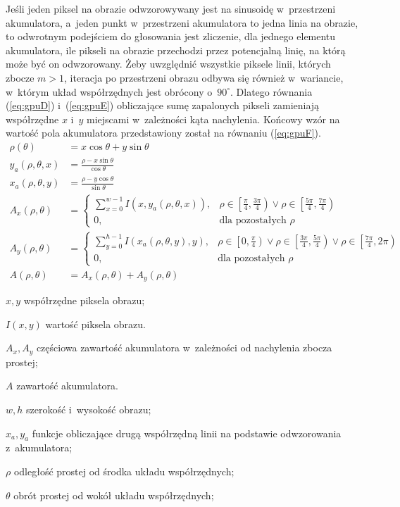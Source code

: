 Jeśli jeden piksel na obrazie odwzorowywany jest na sinusoidę w~przestrzeni akumulatora, a~jeden punkt w~przestrzeni akumulatora to jedna linia na obrazie, to odwrotnym podejściem do głosowania jest zliczenie, dla jednego elementu akumulatora, ile pikseli na obrazie przechodzi przez potencjalną linię, na którą może być on odwzorowany. Żeby uwzględnić wszystkie piksele linii, których zbocze $m > 1$, iteracja po przestrzeni obrazu odbywa się również w~wariancie, w~którym układ współrzędnych jest obrócony o~$90^\circ$. Dlatego równania (\ref{eq:gpuD}) i~(\ref{eq:gpuE}) obliczające sumę zapalonych pikseli zamieniają współrzędne $x$ i~$y$ miejscami w~zależności kąta nachylenia.
Końcowy wzór na wartość pola akumulatora przedstawiony został na równaniu (\ref{eq:gpuF}).
\begin{align}
    \rho(\theta) &= x\cos{\theta} + y\sin{\theta} \label{eq:gpuA} \\
    y_a(\rho,\theta,x) &= \frac{\rho-x\sin{\theta}}{\cos{\theta}} \label{eq:gpuB}\\
    x_a(\rho,\theta,y) &= \frac{\rho-y\cos{\theta}}{\sin{\theta}} \label{eq:gpuC}\\
    A_x(\rho, \theta) &= 
    \begin{cases} 
    \sum^{w-1}_{x=0}I(x, y_a(\rho,\theta,x)),&\rho \in \left[\frac{\pi}{4}, \frac{3\pi}{4}\right) \lor \rho \in \left[\frac{5\pi}{4}, \frac{7\pi}{4}\right) \\
    0,& \text{dla pozostałych }\rho
    \end{cases} \label{eq:gpuD}\\
    A_y(\rho, \theta) &= 
    \begin{cases} 
    \sum^{h-1}_{y=0} I(x_a(\rho,\theta,y), y),& \rho \in \left[0, \frac{\pi}{4}\right) \lor \rho \in \left[\frac{3\pi}{4}, \frac{5\pi}{4}\right) \lor \rho \in \left[\frac{7\pi}{4}, 2\pi\right) \\
    0,& \text{dla pozostałych }\rho
    \end{cases} \label{eq:gpuE}\\
    A(\rho, \theta) &= A_x(\rho, \theta) + A_y(\rho, \theta) \label{eq:gpuF}
\end{align}
\begin{eqexpl}
    \item{$x, y$} współrzędne piksela obrazu;
    \item{$I(x, y)$} wartość piksela obrazu.
    \item{$A_x, A_y$} częściowa zawartość akumulatora w~zależności od nachylenia zbocza prostej;
    \item{$A$} zawartość akumulatora.
    \item{$w, h$} szerokość i~wysokość obrazu;
    \item{$x_a, y_a$} funkcje obliczające drugą współrzędną linii na podstawie odwzorowania z~akumulatora;
    \item{$\rho$} odległość prostej od środka układu współrzędnych;
    \item{$\theta$} obrót prostej od wokół układu współrzędnych;
\end{eqexpl}
\vspace{0.5cm}


